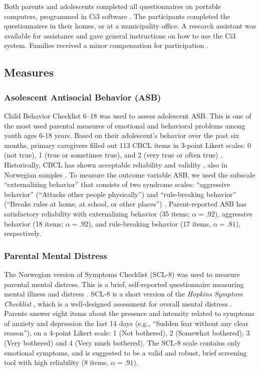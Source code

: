 \documentclass{sn-jnl}                  %
\begin{document}
Both parents and adolescents completed all questionnaires on portable computers, programmed in \textsf{Ci3} software \citep{sawtooth:2013}. The participants completed the questionnaires in their homes, or at a municipality office. A research assistant was available for assistance and gave general instructions on how to use the \textsf{Ci3} system. Families received a minor compensation for participation \citep[equivalent to 50 USD][]{thogersen:2020}.

\subsection{Measures}

\subsubsection{Asolescent Antisocial Behavior (ASB)}

Child Behavior Checklist 6--18 \citep[CBCL, ][]{achenbach:2001} was used to assess adolescent ASB. This is one of the most used parental measures of emotional and behavioral problems among youth ages 6-18 years. Based on their adolescent's behavior over the past six months, primary caregivers filled out 113 CBCL items in 3-point Likert scales: 0 (not true), 1 (true or sometimes true), and 2 (very true or often true) \citep{achenbach:2001}. Historically, CBCL has shown acceptable reliability and validity \citep{achenbach:2001, naarking:2004, pandolfi:2014}, also in Norwegian samples \citep{lurie:2006}. To measure the outcome variable ASB, we used the subscale ``externalizing behavior'' that consists of two syndrome scales: ``aggressive behavior'' (``Attacks other people physically'') and ``rule-breaking behavior” (``Breaks rules at home, at school, or other places'') \citep{achenbach:2001}. Parent-reported ASB has satisfactory reliability with externalizing behavior (35 items; $\alpha = .92$), aggressive behavior (18 items; $\alpha = .92$), and rule-breaking behavior (17 items, $\alpha = .81$), respectively.

\subsubsection{Parental Mental Distress}

The Norwegian version of Symptoms Checklist (SCL-8) was used to measure parental mental distress. This is a brief, self-reported questionnaire measuring mental illness and distress \citep{fink:2004a}. SCL-8 is a short version of the \textit{Hopkins Symptom Checklist} \citep[SCL-90][]{derogatis:1974}, which is a well-designed assessment for overall mental distress \citep{siqveland:2016}. Parents answer eight items about the presence and intensity related to symptoms of anxiety and depression the last 14 days (e.g., ``Sudden fear without any clear reason''), on a 4-point Likert scale: 1 (Not bothered), 2 (Somewhat bothered), 3 (Very bothered) and 4 (Very much bothered). The SCL-8 scale contains only emotional symptoms, and is suggested to be a valid and robust, brief screening tool \citep{fink:2004a, fink:2004b} with high reliability (8 items, $\alpha = .91$).
\end{document}
